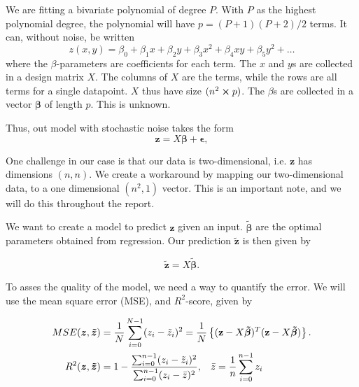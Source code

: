 \documentclass[reprint,english,notitlepage,aps,nobalancelastpage,nofootinbib]{revtex4-1}  %
\newcommand{\vc}[1]{\mathbf{#1}}
\begin{document}
We are fitting a bivariate polynomial of degree $P$. With $P$ as the highest polynomial degree, the polynomial will have $p=(P+1)(P+2) / 2$ terms. It can, without noise, be written
\begin{equation}\label{eq:zpolynm}
	z(x, y) = \beta_0 + \beta_1x + \beta_2y + \beta_3x^2 + \beta_4xy + \beta_5y^2 + \dots
\end{equation}
where the $\beta$-parameters are coefficients for each term. The $x$ and $y$s are collected in a design matrix $X$. The columns of $X$ are the terms, while the rows are all terms for a single datapoint. $X$ thus have size $(n^2\cross p)$. The $\beta$s are collected in a vector $\boldsymbol{\beta}$ of length $p$. This is unknown.

Thus, out model with stochastic noise takes the form
\begin{equation}
	\label{eq:z_true_data}
	\vc{z} = X \boldsymbol{\beta} + \boldsymbol{\epsilon},
\end{equation}

One challenge in our case is that our data is two-dimensional, i.e. $\vc{z}$ has dimensions $(n,n)$. We create a workaround by mapping our two-dimensional data, to a one dimensional $(n^2,1)$ vector. This is an important note, and we will do this throughout the report.

We want to create a model to predict $\vc{z}$ given an input. $\boldsymbol{\tilde\beta}$ are the optimal parameters obtained from regression. Our prediction \(\boldsymbol{\tilde{\vc{z}}}\) is then given by

\begin{equation*}
	\boldsymbol{\tilde{z}} = X\boldsymbol{\tilde{\beta}}.
\end{equation*}

To asses the quality of the model, we need a way to quantify the error. We will use the mean square error (MSE), and $R^2$-score, given by

{\large
\begin{align*}
	MSE(\boldsymbol{z}, \boldsymbol{\tilde{z}}) &= \frac{1}{N}\sum_{i=0}^{N-1} (z_i - \tilde{z}_i)^2 = \frac{1}{N}\left\{(\vc{z} - X\boldsymbol{\tilde{\beta}})^T(\vc{z} - X\boldsymbol{\tilde{\beta}})\right\}.
	\\
	R^2(\boldsymbol{z}, \boldsymbol{\tilde{z}}) &= 1 - \frac{\sum_{i=0}^{n-1}(z_i - \tilde{z}_i)^2}{\sum_{i=0}^{n-1}(z_i - \bar{z})^2}, \hspace{3mm} \bar{z} = \frac{1}{n}\sum_{i=0}^{n-1}z_i
\end{align*}
}%
\end{document}
